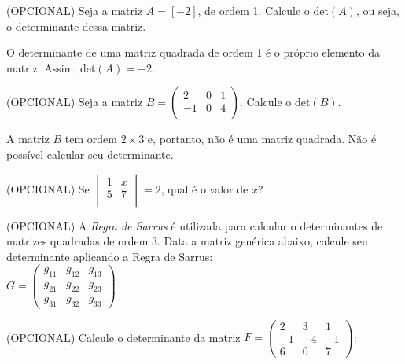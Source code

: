 \documentclass[pdftex, brazil, 12pt, oneside, addpoints]{exam}
\begin{document}
\begin{questions}

\question
(OPCIONAL) Seja a matriz $A = [-2]$, de ordem 1. Calcule o det$(A)$, ou seja, o determinante
dessa matriz.
\begin{solution}
  O determinante de uma matriz quadrada de ordem 1 é o próprio elemento da matriz.
  Assim, det$(A) = -2$.
\end{solution}

\question
(OPCIONAL) Seja a matriz $B = \begin{pmatrix}
  2 & 0 & 1\\
 -1 & 0 & 4\\
\end{pmatrix}$. Calcule o det$(B)$.
\begin{solution}
  A matriz $B$ tem ordem $2 \times 3$ e, portanto, não é uma matriz quadrada.
  Não é possível calcular seu determinante.
\end{solution}

\question
(OPCIONAL) Se
$\begin{vmatrix}
  1 & x\\
  5 & 7\\
\end{vmatrix} = 2$, qual é o valor de $x$?

\question
(OPCIONAL) A \emph{Regra de Sarrus} é utilizada para calcular o determinantes de matrizes
quadradas de ordem $3$. Data a matriz genérica abaixo, calcule seu
determinante aplicando a Regra de Sarrus:\\%
$G = \begin{pmatrix}
   g_{11} & g_{12} & g_{13}\\
   g_{21} & g_{22} & g_{23}\\
   g_{31} & g_{32} & g_{33}
\end{pmatrix}$

\question
(OPCIONAL) Calcule o determinante da matriz
$F = \begin{pmatrix}
   2 &  3 &  1\\
  -1 & -4 & -1\\
   6 &  0 & 7
\end{pmatrix}$:


\end{questions}
\end{document}
